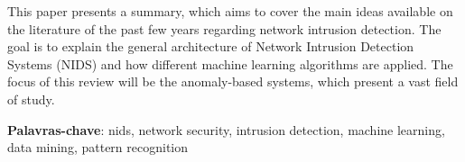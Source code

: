 This paper presents a summary, which aims to cover the main ideas available on the
literature of the past few years regarding network intrusion detection. The goal is to
explain the general architecture of Network Intrusion Detection Systems (NIDS) and how
different machine learning algorithms are applied. The focus of this review will be the
anomaly-based systems, which present a vast field of study.

\noindent \textbf{Palavras-chave}: nids, network security, intrusion detection, machine learning, data mining, pattern recognition

